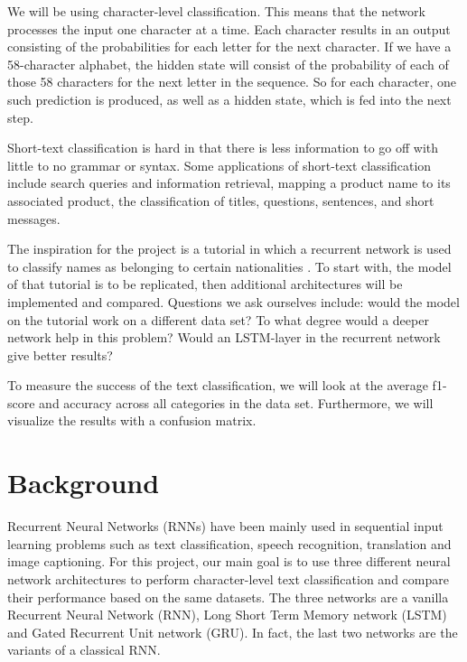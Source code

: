 \documentclass[runningheads]{llncs}
\begin{document}
We will be using character-level classification. This means that the network processes the input one character at a time. Each character results in an output consisting of the probabilities for each letter for the next character. If we have a 58-character alphabet, the hidden state will consist of the probability of each of those 58 characters for the next letter in the sequence. So for each character, one such prediction is produced, as well as a hidden state, which is fed into the next step.

Short-text classification is hard in that there is less information to go off with little to no grammar or syntax. Some applications of short-text classification include search queries and information retrieval, mapping a product name to its associated product, the classification of titles, questions, sentences, and short messages.

The inspiration for the project is a tutorial in which a recurrent network is used to classify names as belonging to certain nationalities \cite{tutorial}. To start with, the model of that tutorial is to be replicated, then additional architectures will be implemented and compared. Questions we ask ourselves include: would the model on the tutorial work on a different data set? To what degree would a deeper network help in this problem? Would an LSTM-layer in the recurrent network give better results? 

To measure the success of the text classification, we will look at the average f1-score and accuracy across all categories in the data set. Furthermore, we will visualize the results with a confusion matrix.


\section{Background}


Recurrent Neural Networks (RNNs) have been mainly used in sequential input learning problems such as text classification, speech recognition, translation and image captioning. For this project, our main goal is to use three different neural network architectures to perform character-level text classification and compare their performance based on the same datasets. The three networks are a vanilla Recurrent Neural Network (RNN), Long Short Term Memory network (LSTM) and Gated Recurrent Unit network (GRU). In fact, the last two networks are the variants of a classical RNN. 
\end{document}
